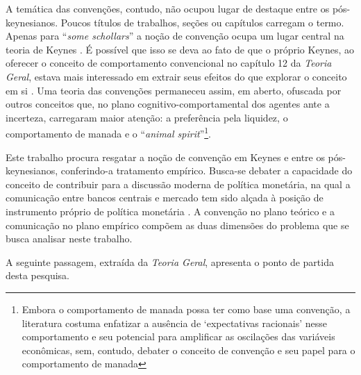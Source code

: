 A temática das convenções, contudo, não ocupou lugar de destaque entre os pós-keynesianos. Poucos títulos de trabalhos, seções ou capítulos carregam o termo. Apenas para \enquote{\textit{some schollars}} a noção de convenção ocupa um lugar central na teoria de Keynes \parencite[p. 145]{dequech_conventions_2022}. É possível que isso se deva ao fato de que o próprio Keynes, ao oferecer o conceito de comportamento convencional no capítulo 12 da \textit{Teoria Geral}, estava mais interessado em extrair seus efeitos do que explorar o conceito em si \parencite[p. 238]{carvalho_keynes_2020}. Uma teoria das convenções permaneceu assim, em aberto, ofuscada por outros conceitos que, no plano cognitivo-comportamental dos agentes ante a incerteza, carregaram maior atenção: a preferência pela liquidez, o comportamento de manada e o \enquote{\textit{animal spirit}}\footnote{Embora o comportamento de manada possa ter como base uma convenção, a literatura costuma enfatizar a ausência de ‘expectativas racionais’ nesse comportamento e seu potencial para amplificar as oscilações das variáveis econômicas, sem, contudo, debater o conceito de convenção e seu papel para o comportamento de manada}.

Este trabalho procura resgatar a noção de convenção em Keynes e entre os pós-keynesianos, conferindo-a tratamento empírico. Busca-se debater a capacidade do conceito de contribuir para a discussão moderna de política monetária, na qual a comunicação entre bancos centrais e mercado tem sido alçada à posição de instrumento próprio de política monetária \parencite{blinder_central_2008}. A convenção no plano teórico e a comunicação no plano empírico compõem as duas dimensões do problema que se busca analisar neste trabalho.  

A seguinte passagem, extraída da \textit{Teoria Geral}, apresenta o ponto de partida desta pesquisa.  

